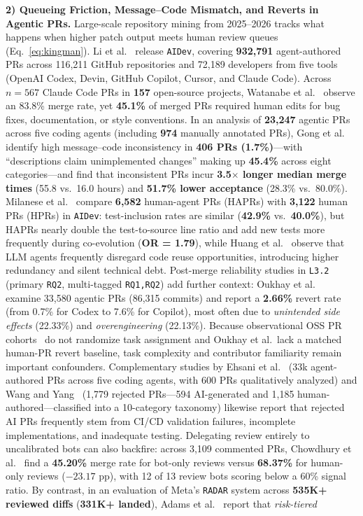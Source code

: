 \documentclass[10pt,twocolumn,a4paper]{article}
\begin{document}
\textbf{2) Queueing Friction, Message--Code Mismatch, and Reverts in Agentic PRs.} Large-scale repository mining from 2025--2026 tracks what happens when higher patch output meets human review queues (Eq.~\eqref{eq:kingman}). Li et al.~\cite{li2026aidev} release \texttt{AIDev}, covering \textbf{932,791} agent-authored PRs across 116,211 GitHub repositories and 72,189 developers from five tools (OpenAI Codex, Devin, GitHub Copilot, Cursor, and Claude Code). Across \textbf{$n=567$} Claude Code PRs in \textbf{157} open-source projects, Watanabe et al.~\cite{watanabe2025use} observe an 83.8\% merge rate, yet \textbf{45.1\%} of merged PRs required human edits for bug fixes, documentation, or style conventions. In an analysis of \textbf{23,247} agentic PRs across five coding agents (including \textbf{974} manually annotated PRs), Gong et al.~\cite{gong2026analyzing} identify high message--code inconsistency in \textbf{406 PRs (1.7\%)}---with ``descriptions claim unimplemented changes'' making up \textbf{45.4\%} across eight categories---and find that inconsistent PRs incur \textbf{3.5$\times$ longer median merge times} (55.8 vs.\ 16.0 hours) and \textbf{51.7\% lower acceptance} (28.3\% vs.\ 80.0\%). Milanese et al.~\cite{milanese2026humanagent} compare \textbf{6,582} human-agent PRs (HAPRs) with \textbf{3,122} human PRs (HPRs) in \texttt{AIDev}: test-inclusion rates are similar (\textbf{42.9\%} vs.\ \textbf{40.0\%}), but HAPRs nearly double the test-to-source line ratio and add new tests more frequently during co-evolution (\textbf{OR = 1.79}), while Huang et al.~\cite{huang2026more} observe that LLM agents frequently disregard code reuse opportunities, introducing higher redundancy and silent technical debt. Post-merge reliability studies in \texttt{L3.2} (primary \texttt{RQ2}, multi-tagged \texttt{RQ1,RQ2}) add further context: Oukhay et al.~\cite{oukhay2026code} examine 33,580 agentic PRs (86,315 commits) and report a \textbf{2.66\%} revert rate (from 0.7\% for Codex to 7.6\% for Copilot), most often due to \emph{unintended side effects} (22.33\%) and \emph{overengineering} (22.13\%). Because observational OSS PR cohorts~\cite{gong2026analyzing,oukhay2026code,watanabe2025use} do not randomize task assignment and Oukhay et al.\ lack a matched human-PR revert baseline, task complexity and contributor familiarity remain important confounders. Complementary studies by Ehsani et al.~\cite{ehsani2026where} (33k agent-authored PRs across five coding agents, with 600 PRs qualitatively analyzed) and Wang and Yang~\cite{wang2026aigenerated} (1,779 rejected PRs---594 AI-generated and 1,185 human-authored---classified into a 10-category taxonomy) likewise report that rejected AI PRs frequently stem from CI/CD validation failures, incomplete implementations, and inadequate testing. Delegating review entirely to uncalibrated bots can also backfire: across 3,109 commented PRs, Chowdhury et al.~\cite{chowdhury2026industry} find a \textbf{45.20\%} merge rate for bot-only reviews versus \textbf{68.37\%} for human-only reviews ($-23.17$ pp), with 12 of 13 review bots scoring below a 60\% signal ratio. By contrast, in an evaluation of Meta's \texttt{RADAR} system across \textbf{535K+ reviewed diffs} (\textbf{331K+ landed}), Adams et al.~\cite{adams2026automating} report that \emph{risk-tiered} 
\end{document}
